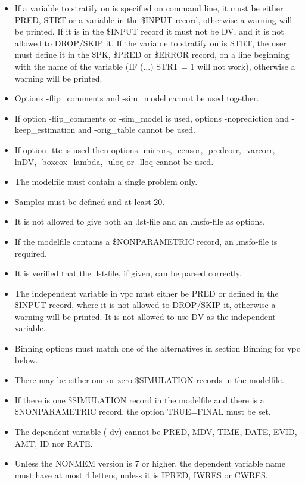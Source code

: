 \begin{itemize}
	\item If a variable to stratify on is specified on command line, it must be either PRED, STRT or a variable in the \$INPUT record, otherwise a warning will be printed. If it is in the \$INPUT record it must not be DV, and it is not allowed to DROP/SKIP it. If the variable to stratify on is STRT, the user must define it in the \$PK, \$PRED or \$ERROR record, on a line beginning with the name of the variable (IF (...) STRT = 1 will not work), otherwise a warning will be printed.
	\item Options -flip\_comments and -sim\_model cannot be used together.
	\item If option -flip\_comments or -sim\_model is used, options -noprediction and -keep\_estimation and -orig\_table cannot be used.
	\item If option -tte is used then options -mirrors, -censor, -predcorr, -varcorr, -lnDV, -boxcox\_lambda, -uloq or -lloq cannot be used.   
	\item The modelfile must contain a single problem only.
	\item Samples must be defined and at least 20.
	\item It is not allowed to give both an .lst-file and an .msfo-file as options.
	\item If the modelfile contains a \$NONPARAMETRIC record, an .msfo-file is required.
	\item It is verified that the .lst-file, if given, can be parsed correctly.
	\item The independent variable in vpc must either be PRED or defined in the \$INPUT record, where it is not allowed to DROP/SKIP it, otherwise a warning will be printed. It is not allowed to use DV as the independent variable.
	\item Binning options must match one of the alternatives in section Binning for vpc below.
	\item There may be either one or zero \$SIMULATION records in the modelfile. 
	\item If there is one \$SIMULATION record in the modelfile and there is a \$NONPARAMETRIC record, the option TRUE=FINAL must be set.
	\item The dependent variable (-dv) cannot be PRED, MDV, TIME, DATE, EVID, AMT, ID nor RATE.
	\item Unless the NONMEM version is 7 or higher, the dependent variable name must have at most 4 letters, unless it is IPRED, IWRES or CWRES.

\end{itemize}
